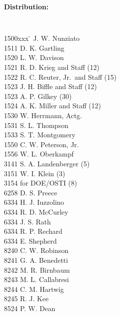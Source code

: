 \cleardoublepage
%
%
\twocolumn %
%
{\bf Distribution:}
\par
%
{\tt %
\begin{tabbing}
1500xxx \=  \> J. W. Nunziato \\
1511 \> D. K. Gartling \\
1520 \> L. W. Davison \\
1521 \> R. D. Krieg and Staff (12) \\
1522 \> R. C. Reuter, Jr.\ and Staff (15) \\
1523 \> J. H. Biffle and Staff (12) \\
1523 \> A. P. Gilkey (30) \\
1524 \> A. K. Miller and Staff (12) \\
1530 \> W. Herrmann, Actg. \\
1531 \> S. L. Thompson \\
1533 \> S. T. Montgomery \\
1550 \> C. W. Peterson, Jr.\ \\
1556 \> W. L. Oberkampf \\
3141 \> S. A. Landenberger (5) \\
3151 \> W. I. Klein (3) \\
3154 \> for DOE/OSTI (8) \\
6258 \> D. S. Preece \\
6334 \> H. J. Iuzzolino \\
6334 \> R. D. McCurley \\
6334 \> J. S. Rath \\
6334 \> R. P. Rechard \\
6334 \> E. Shepherd \\
8240 \> C. W. Robinson \\
8241 \> G. A. Benedetti \\
8242 \> M. R. Birnbaum \\
8243 \> M. L. Callabresi \\
8244 \> C. M. Hartwig \\
8245 \> R. J. Kee \\
8524 \> P. W. Dean \\
\end{tabbing}
}
%
